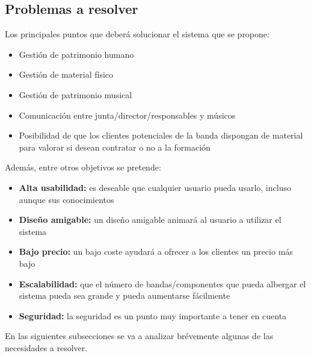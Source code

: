 \documentclass[11pt,spanish]{article}
\begin{document}
\subsection{Problemas a resolver}
Los principales puntos que deberá solucionar el sistema que se propone:
\begin{itemize}
  \item Gestión de patrimonio humano
  \item Gestión de material físico
  \item Gestión de patrimonio musical
  \item Comunicación entre junta/director/responsables y músicos
  \item Posibilidad de que los clientes potenciales de la banda dispongan de
  material para valorar si desean contratar o no a la formación
\end{itemize}

\setlength{\parskip}{10pt plus 1pt minus 1pt}

Además, entre otros objetivos se pretende:
\begin{itemize}
  \item \textbf{Alta usabilidad:} es deseable que cualquier usuario pueda usarlo,
    incluso aunque sus conocimientos
  \item \textbf{Diseño amigable:} un diseño amigable animará al usuario a utilizar el sistema
  \item \textbf{Bajo precio:} un bajo coste ayudará a ofrecer a los clientes un precio más bajo
  \item \textbf{Escalabilidad:} que el número de bandas/componentes que pueda albergar el sistema
  pueda sea grande y pueda aumentarse fácilmente
  \item \textbf{Seguridad:} la seguridad es un punto muy importante a tener en cuenta
\end{itemize}


En las siguientes subsecciones se va a analizar brévemente algunas de las necesidades a
resolver.
\end{document}
